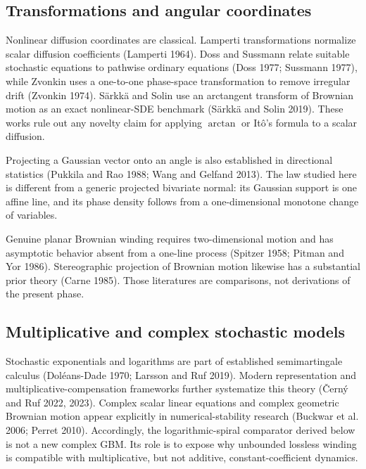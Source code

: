 \documentclass[
  english,
  10pt,
  letterpaper,
  DIV=11,
  numbers=noendperiod]{scrartcl}
\theoremstyle{definition}
\theoremstyle{plain}
\theoremstyle{plain}
\theoremstyle{remark}
\begin{document}
\subsection{Transformations and angular
coordinates}\label{transformations-and-angular-coordinates}

Nonlinear diffusion coordinates are classical. Lamperti transformations
normalize scalar diffusion coefficients (Lamperti 1964). Doss and
Sussmann relate suitable stochastic equations to pathwise ordinary
equations (Doss 1977; Sussmann 1977), while Zvonkin uses a one-to-one
phase-space transformation to remove irregular drift (Zvonkin 1974).
Särkkä and Solin use an arctangent transform of Brownian motion as an
exact nonlinear-SDE benchmark (Särkkä and Solin 2019). These works rule
out any novelty claim for applying \(\arctan\) or Itô's formula to a
scalar diffusion.

Projecting a Gaussian vector onto an angle is also established in
directional statistics (Pukkila and Rao 1988; Wang and Gelfand 2013).
The law studied here is different from a generic projected bivariate
normal: its Gaussian support is one affine line, and its phase density
follows from a one-dimensional monotone change of variables.

Genuine planar Brownian winding requires two-dimensional motion and has
asymptotic behavior absent from a one-line process (Spitzer 1958; Pitman
and Yor 1986). Stereographic projection of Brownian motion likewise has
a substantial prior theory (Carne 1985). Those literatures are
comparisons, not derivations of the present phase.

\subsection{Multiplicative and complex stochastic
models}\label{multiplicative-and-complex-stochastic-models}

Stochastic exponentials and logarithms are part of established
semimartingale calculus (Doléans-Dade 1970; Larsson and Ruf 2019).
Modern representation and multiplicative-compensation frameworks further
systematize this theory (Černý and Ruf 2022, 2023). Complex scalar
linear equations and complex geometric Brownian motion appear explicitly
in numerical-stability research (Buckwar et al. 2006; Perret 2010).
Accordingly, the logarithmic-spiral comparator derived below is not a
new complex GBM. Its role is to expose why unbounded lossless winding is
compatible with multiplicative, but not additive, constant-coefficient
dynamics.
\end{document}
